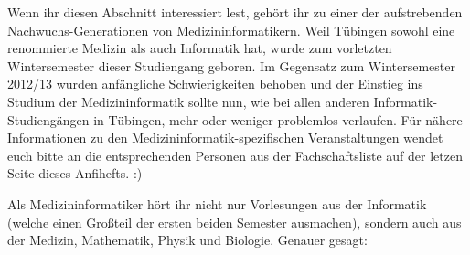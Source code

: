 
Wenn ihr diesen Abschnitt interessiert lest, gehört ihr zu einer der aufstrebenden Nachwuchs-Generationen von Medizininformatikern. Weil Tübingen sowohl eine renommierte Medizin als auch Informatik hat, wurde zum vorletzten Wintersemester dieser Studiengang geboren. Im Gegensatz zum Wintersemester 2012/13 wurden anfängliche Schwierigkeiten behoben und der Einstieg ins Studium der Medizininformatik sollte nun, wie bei allen anderen Informatik-Studiengängen in Tübingen, mehr oder weniger problemlos verlaufen.
Für nähere Informationen zu den Medizininformatik-spezifischen Veranstaltungen
wendet euch bitte an die entsprechenden Personen aus der Fachschaftsliste auf
der letzen Seite dieses Anfihefts. :)

Als Medizininformatiker hört ihr nicht nur Vorlesungen aus der Informatik (welche einen Großteil der ersten beiden Semester ausmachen), sondern auch aus der Medizin, Mathematik, Physik und Biologie. Genauer gesagt:
